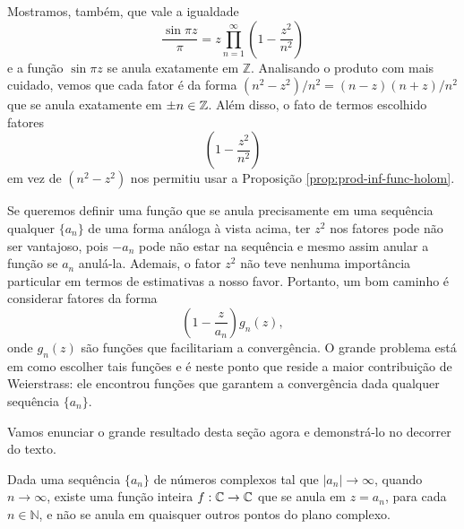     Mostramos, também, que vale a igualdade 
    $$\frac{\sin{\pi z}}{\pi} = z \prod_{n = 1}^{\infty} \left(1 - \frac{z^2}{n^2}\right)$$
    e a função $\sin{\pi z}$ se anula exatamente em $\mathbb{Z}$. 
    Analisando o produto com mais cuidado, vemos que cada fator é da forma 
    $(n^2 - z^2)/n^2 = (n - z)(n + z)/n^2$ que se anula exatamente em $\pm n \in \mathbb{Z}$. 
    Além disso, o fato de termos escolhido fatores 
    $$\left(1 - \frac{z^2}{n^2}\right)$$
    em vez de $(n^2 - z^2)$ nos permitiu usar a Proposição \ref{prop:prod-inf-func-holom}. 
    
    Se queremos definir uma função que se anula precisamente em uma sequência 
    qualquer $\{a_n\}$ de uma forma análoga à vista acima, ter $z^2$ nos 
    fatores pode não ser vantajoso, pois $-a_n$ pode não estar na sequência e mesmo 
    assim anular a função se $a_n$ anulá-la. Ademais, o fator $z^2$ não teve nenhuma 
    importância particular em termos de estimativas a nosso favor. Portanto, um bom 
    caminho é considerar fatores da forma
    $$ \left(1 - \frac{z}{a_n}\right)g_n(z), $$
    onde $g_n(z)$ são funções que facilitariam a convergência. O grande problema 
    está em como escolher tais funções e é neste ponto que reside a maior 
    contribuição de Weierstrass: ele encontrou funções que garantem a 
    convergência dada qualquer sequência $\{a_n\}$.
    
    Vamos enunciar o grande resultado desta seção agora 
    e demonstrá-lo no decorrer do texto.
    
    \begin{teorema}
    \label{teo-Weierstrass-fatoracao}
        Dada uma sequência $\{a_n\}$ de números complexos tal que 
        $|a_n| \to \infty$, quando $n \to \infty$, 
        existe uma função inteira $f: \mathbb{C} \to \mathbb{C}$ que 
        se anula em $z=a_n$, para cada $n\in\mathbb{N}$, 
        e não se anula em quaisquer outros pontos do plano complexo.
    \end{teorema}
 
 \bigskip 
    
